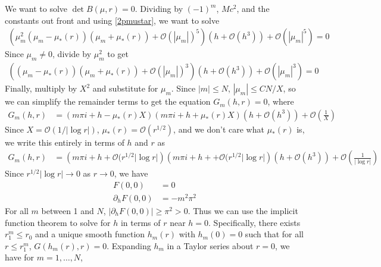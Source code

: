 \documentclass[thesis.tex]{subfiles}
\begin{document}
We want to solve $\det B(\mu, r) = 0$. Dividing by $(-1)^m$, $M c^2$, and the constants out front and using \cref{2pmustar}, we want to solve 
\begin{equation}\label{Bess2}
\begin{aligned}
\left(\mu_m^2 (\mu_m - \mu_*(r))(\mu_m + \mu_*(r)) + \mathcal{O}( |\mu_m|)^5 \right) \left( h + \mathcal{O}(h^3) \right) + \mathcal{O}\left( |\mu_m|^5 \right) = 0
\end{aligned}
\end{equation}
Since $\mu_m \neq 0$, divide by $\mu_m^2$ to get
\begin{equation}\label{Bess3}
\begin{aligned}
\left((\mu_m - \mu_*(r))(\mu_m + \mu_*(r)) + \mathcal{O}( |\mu_m|)^3 \right) \left( h + \mathcal{O}(h^3) \right) + \mathcal{O}\left( |\mu_m|^3 \right) = 0
\end{aligned}
\end{equation}
Finally, multiply by $X^2$ and substitute for $\mu_m$. Since $|m| \leq N$, $|\mu_m| \leq C N/X$, so we can simplify the remainder terms to get the equation $G_m(h, r) = 0$, where
\begin{equation}\label{Bess4}
\begin{aligned}
G_m(h, r) &= (m \pi i + h - \mu_*(r) X)(m \pi i + h + \mu_*(r) X) \left( h + \mathcal{O}(h^3) \right) + \mathcal{O}\left( \frac{1}{X} \right)
\end{aligned}
\end{equation}
Since $X = \mathcal{O}(1/|\log r|)$, $\mu_*(r) = \mathcal{O}(r^{1/2})$, and we don't care what $\mu_*(r)$ is, we write this entirely in terms of $h$ and $r$ as
\begin{equation}\label{Bess4}
\begin{aligned}
G_m(h, r) &= \left( m \pi i + h + \mathcal{O}(r^{1/2}|\log r| \right)\left(m \pi i + h + + \mathcal{O}(r^{1/2}|\log r| \right) \left( h + \mathcal{O}(h^3) \right) + \mathcal{O}\left( \frac{1}{|\log r|} \right)
\end{aligned}
\end{equation}
Since
$r^{1/2}|\log r| \rightarrow 0$ as $r \rightarrow 0$, we have
\begin{align*}
F(0,0) &= 0 \\
\partial_h F(0,0) &= -m^2 \pi^2
\end{align*}
For all $m$ between 1 and $N$, $|\partial_h F(0,0)| \geq \pi^2 > 0$. Thus we can use the implicit function theorem to solve for $h$ in terms of $r$ near $h = 0$. Specifically, there exists $r_1^m \leq r_0$ and a unique smooth function $h_m(r)$ with $h_m(0) = 0$ such that for all $r \leq r_1^m$, $G(h_m(r),r) = 0$. Expanding $h_m$ in a Taylor series about $r = 0$, we have for $m = 1, \dots, N$,
\end{document}
